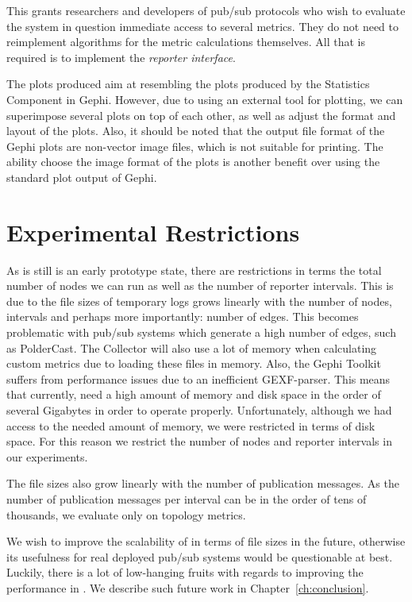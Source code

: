 This grants researchers and developers of pub/sub protocols who wish to evaluate
the system in question immediate access to several metrics. They do not need to
reimplement algorithms for the metric calculations themselves. All that is
required is to implement the \emph{reporter interface}.

The plots produced aim at resembling the plots produced by the
Statistics Component in Gephi. However, due to using an external tool
for plotting, we can superimpose several plots on top of each other, as
well as adjust the format and layout of the plots. Also, it should be
noted that the output file format of the Gephi plots are non-vector
image files, which is not suitable for printing. The ability choose the
image format of the plots is another benefit over using the
standard plot output of Gephi.

\section{Experimental Restrictions}

As \demo{} is still is an early prototype state, there are restrictions
in terms the total number of nodes we can run as well as the number of
reporter intervals. This is due to the file sizes of temporary logs
grows linearly with the number of nodes, intervals and perhaps more
importantly: number of edges. This becomes problematic with pub/sub
systems which generate a high number of edges, such as PolderCast. The
Collector will also use a lot of memory when calculating custom metrics
due to loading these files in memory. Also, the Gephi Toolkit suffers
from performance issues due to an inefficient GEXF-parser. This means
that currently, \demo{} need a high amount of memory and disk space in
the order of several Gigabytes in order to operate properly.
Unfortunately, although we had access to the needed amount of memory, we
were restricted in terms of disk space. For this reason we restrict the
number of nodes and reporter intervals in our experiments.

The file sizes also grow linearly with the number of publication
messages. As the number of publication messages per interval can be in
the order of tens of thousands,  we evaluate only on topology metrics.

We wish to improve the scalability of \demo{} in terms of file sizes in
the future, otherwise its usefulness for real deployed pub/sub systems
would be questionable at best. Luckily, there is a lot of low-hanging
fruits with regards to improving the performance in \demo{}. We describe
such future work in Chapter~\ref{ch:conclusion}.

